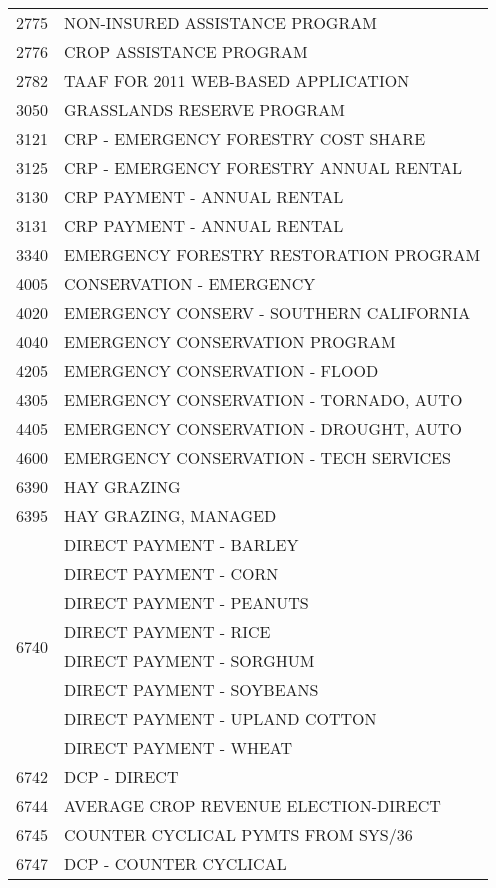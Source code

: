 \begin{longtable}{ll}
\cline{1-2}
2775 & NON-INSURED ASSISTANCE PROGRAM \\
\cline{1-2}
2776 & CROP ASSISTANCE PROGRAM \\
\cline{1-2}
2782 & TAAF FOR 2011 WEB-BASED APPLICATION \\
\cline{1-2}
3050 & GRASSLANDS RESERVE PROGRAM \\
\cline{1-2}
3121 & CRP - EMERGENCY FORESTRY COST SHARE \\
\cline{1-2}
3125 & CRP - EMERGENCY FORESTRY ANNUAL RENTAL \\
\cline{1-2}
3130 & CRP PAYMENT - ANNUAL RENTAL \\
\cline{1-2}
3131 & CRP PAYMENT - ANNUAL RENTAL \\
\cline{1-2}
3340 & EMERGENCY FORESTRY RESTORATION PROGRAM \\
\cline{1-2}
4005 & CONSERVATION - EMERGENCY \\
\cline{1-2}
4020 & EMERGENCY CONSERV - SOUTHERN CALIFORNIA \\
\cline{1-2}
4040 & EMERGENCY CONSERVATION PROGRAM \\
\cline{1-2}
4205 & EMERGENCY CONSERVATION - FLOOD \\
\cline{1-2}
4305 & EMERGENCY CONSERVATION - TORNADO, AUTO \\
\cline{1-2}
4405 & EMERGENCY CONSERVATION - DROUGHT, AUTO \\
\cline{1-2}
4600 & EMERGENCY CONSERVATION - TECH SERVICES \\
\cline{1-2}
6390 & HAY GRAZING \\
\cline{1-2}
6395 & HAY GRAZING, MANAGED \\
\cline{1-2}
\multirow[t]{8}{*}{6740} & DIRECT PAYMENT - BARLEY \\
 & DIRECT PAYMENT - CORN \\
 & DIRECT PAYMENT - PEANUTS \\
 & DIRECT PAYMENT - RICE \\
 & DIRECT PAYMENT - SORGHUM \\
 & DIRECT PAYMENT - SOYBEANS \\
 & DIRECT PAYMENT - UPLAND COTTON \\
 & DIRECT PAYMENT - WHEAT \\
\cline{1-2}
6742 & DCP - DIRECT \\
\cline{1-2}
6744 & AVERAGE CROP REVENUE ELECTION-DIRECT \\
\cline{1-2}
6745 & COUNTER CYCLICAL PYMTS FROM SYS/36 \\
\cline{1-2}
6747 & DCP - COUNTER CYCLICAL \\

\end{longtable}
